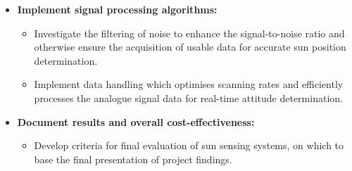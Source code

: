 \begin{itemize}
\item \textbf{Implement signal processing algorithms:}
\begin{itemize}
    \item Investigate the filtering of noise to enhance the signal-to-noise ratio and otherwise ensure the acquisition of usable data for accurate sun position determination.
    \item Implement data handling which optimises scanning rates and efficiently processes the analogue signal data for real-time attitude determination.
\end{itemize}

\item \textbf{Document results and overall cost-effectiveness:}
\begin{itemize}
    \item Develop criteria for final evaluation of sun sensing systems, on which to base the final presentation of project findings.
\end{itemize}
\end{itemize}